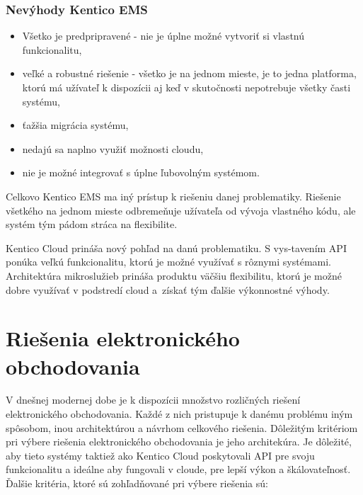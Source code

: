 \documentclass[
  printed, %
  table,   %
  lof,     %
  nolot,     %
  twoside,  
]{fithesis3}
\begin{document}
\subsection{Nevýhody Kentico EMS}
\begin{itemize}
	\item Všetko je predpripravené - nie je úplne možné vytvoriť si vlastnú funkcionalitu,
	\item veľké a robustné riešenie - všetko je na jednom mieste, je to jedna platforma, ktorú má užívateľ k dispozícii aj keď v skutočnosti nepotrebuje všetky časti systému,
	\item ťažšia migrácia systému,
	\item nedajú sa naplno využiť možnosti cloudu,
	\item nie je možné integrovať s úplne ľubovolným systémom.
\end{itemize}

Celkovo Kentico EMS ma iný prístup k riešeniu danej problematiky. Riešenie všetkého na jednom mieste odbremeňuje užívateľa od vývoja vlastného kódu, ale systém tým pádom stráca na flexibilite.

Kentico Cloud prináša nový pohľad na danú problematiku. S vys-tavením API ponúka veľkú funkcionalitu, ktorú je možné využívať s rôznymi systémami. Architektúra mikroslužieb prináša produktu väčšiu flexibilitu, ktorú je možné dobre využívať v podstredí cloud a~získať tým ďalšie výkonnostné výhody.
\chapter{Riešenia elektronického obchodovania}
V dnešnej modernej dobe je k dispozícii množstvo rozličných riešení elektronického obchodovania. Každé z nich pristupuje k danému problému iným spôsobom, inou architektúrou a návrhom celkového riešenia. Dôležitým kritériom pri výbere riešenia elektronického obchodovania je jeho architekúra. Je dôležité, aby tieto systémy taktiež ako Kentico Cloud poskytovali API pre svoju funkcionalitu a ideálne aby fungovali v cloude, pre lepší výkon a škálovateľnosť. Ďalšie kritéria, ktoré sú zohľadňované pri výbere riešenia sú:
\end{document}
